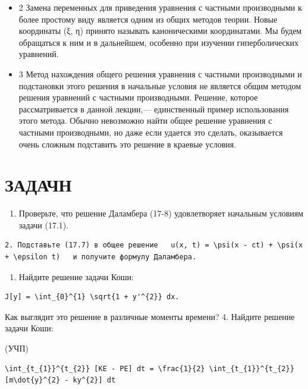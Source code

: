 \documentclass[
  ukrainian,
]{article}
\providecommand{\tightlist}{%
  \setlength{\itemsep}{0pt}\setlength{\parskip}{0pt}}
\begin{document}
\begin{itemize}
\item
  2 Замена переменных для приведения уравнения с частными производными к
  более простому виду является одним из общих методов теории. Новые
  координаты (ξ, η) принято называть каноническими координатами. Мы
  будем обращаться к ним и в дальнейшем, особенно при изучении
  гиперболических уравнений.
\item
  3 Метод нахождения общего решения уравнения с частными производными и
  подстановки этого решения в начальные условия не является общим
  методом решения уравнений с частными производными. Решение, которое
  рассматривается в данной лекции,--- единственный пример использования
  этого метода. Обычно невозможно найти общее решение уравнения с
  частными производными, но даже если удается это сделать, оказывается
  очень сложным подставить это решение в краевые условия.
\end{itemize}

\section{ЗАДАЧН}\label{ux437ux430ux434ux430ux447ux43d}

\begin{enumerate}
\def\labelenumi{\arabic{enumi}.}
\tightlist
\item
  Проверьте, что решение Даламбера (17-8) удовлетворяет начальным
  условиям задачи (17.1).
\end{enumerate}

\begin{verbatim}
2. Подставьте (17.7) в общее решение   u(x, t) = \psi(x - ct) + \psi(x + \epsilon t)   и получите формулу Даламбера.
\end{verbatim}

\begin{enumerate}
\def\labelenumi{\arabic{enumi}.}
\setcounter{enumi}{2}
\tightlist
\item
  Найдите решение задачи Коши:
\end{enumerate}

\begin{verbatim}
J[y] = \int_{0}^{1} \sqrt{1 + y'^{2}} dx.
\end{verbatim}

Как выглядит это решение в различные моменты времени? 4. Найдите решение
задачи Коши:

(УЧП)

\begin{verbatim}
\int_{t_{1}}^{t_{2}} [KE - PE] dt = \frac{1}{2} \int_{t_{1}}^{t_{2}} [m\dot{y}^{2} - ky^{2}] dt
\end{verbatim}
\end{document}
